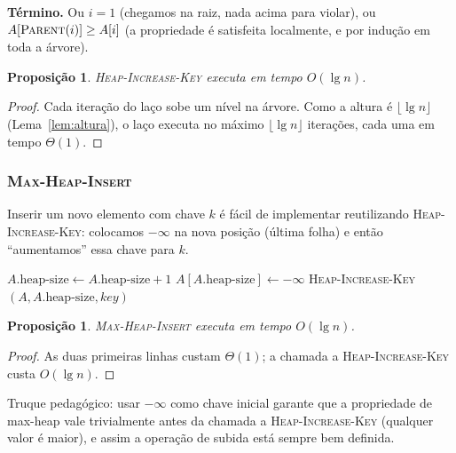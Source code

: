 \documentclass[9pt,a4paper]{extarticle}
\newcommand{\ntc}[1]{\textcolor{notice}{#1}}
\newtheorem{proposition}[theorem]{Proposição}
\theoremstyle{definition}
\begin{document}
\textbf{Término.} Ou $i = 1$ (chegamos na raiz, nada acima para
violar), ou $A[\textsc{Parent}(i)] \ge A[i]$ (a propriedade é satisfeita
localmente, e por indução em toda a árvore).
 
\begin{proposition}
\textsc{Heap-Increase-Key} executa em tempo $O(\lg n)$.
\end{proposition}
 
\begin{proof}
Cada iteração do laço sobe um nível na árvore. Como a altura é
$\lfloor \lg n \rfloor$ (Lema~\ref{lem:altura}), o laço executa no máximo
$\lfloor \lg n \rfloor$ iterações, cada uma em tempo $\Theta(1)$.
\end{proof}
 
\subsubsection{\textsc{Max-Heap-Insert}}
 
Inserir um novo elemento com chave $k$ é fácil de implementar
reutilizando \textsc{Heap-Increase-Key}: colocamos $-\infty$ na nova
posição (última folha) e então ``aumentamos'' essa chave para $k$.
 
\begin{algorithm}[H]
\caption{\textsc{Max-Heap-Insert}$(A, \textit{key})$}
\begin{algorithmic}[1]
\State $A.\text{heap-size} \gets A.\text{heap-size} + 1$
\State $A[A.\text{heap-size}] \gets -\infty$
\State \textsc{Heap-Increase-Key}$(A, A.\text{heap-size}, \textit{key})$
\end{algorithmic}
\end{algorithm}
 
\begin{proposition}
\textsc{Max-Heap-Insert} executa em tempo $O(\lg n)$.
\end{proposition}
 
\begin{proof}
As duas primeiras linhas custam $\Theta(1)$; a chamada a
\textsc{Heap-Increase-Key} custa $O(\lg n)$.
\end{proof}
 
\ntc{Truque pedagógico:} usar $-\infty$ como chave inicial garante que
a propriedade de max-heap vale trivialmente antes da chamada a
\textsc{Heap-Increase-Key} (qualquer valor é maior), e assim a operação
de subida está sempre bem definida.
 
\end{document}
